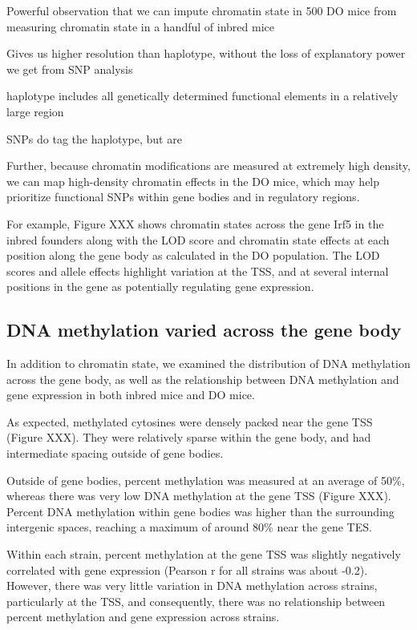 \documentclass[10pt,letterpaper]{article}
\begin{document}
Powerful observation that we can impute chromatin state in 500 DO mice
from measuring chromatin state in a handful of inbred mice

Gives us higher resolution than haplotype, without the loss of
explanatory power we get from SNP analysis

haplotype includes all genetically determined functional elements in a
relatively large region

SNPs do tag the haplotype, but are

Further, because chromatin modifications are measured at extremely high
density, we can map high-density chromatin effects in the DO mice, which
may help prioritize functional SNPs within gene bodies and in regulatory
regions.

For example, Figure XXX shows chromatin states across the gene Irf5 in
the inbred founders along with the LOD score and chromatin state effects
at each position along the gene body as calculated in the DO population.
The LOD scores and allele effects highlight variation at the TSS, and at
several internal positions in the gene as potentially regulating gene
expression.

\hypertarget{dna-methylation-varied-across-the-gene-body}{%
\subsection{DNA methylation varied across the gene
body}\label{dna-methylation-varied-across-the-gene-body}}

In addition to chromatin state, we examined the distribution of DNA
methylation across the gene body, as well as the relationship between
DNA methylation and gene expression in both inbred mice and DO mice.

As expected, methylated cytosines were densely packed near the gene TSS
(Figure XXX). They were relatively sparse within the gene body, and had
intermediate spacing outside of gene bodies.

Outside of gene bodies, percent methylation was measured at an average
of 50\%, whereas there was very low DNA methylation at the gene TSS
(Figure XXX). Percent DNA methylation within gene bodies was higher than
the surrounding intergenic spaces, reaching a maximum of around 80\%
near the gene TES.

Within each strain, percent methylation at the gene TSS was slightly
negatively correlated with gene expression (Pearson r for all strains
was about -0.2). However, there was very little variation in DNA
methylation across strains, particularly at the TSS, and consequently,
there was no relationship between percent methylation and gene
expression across strains.
\end{document}
